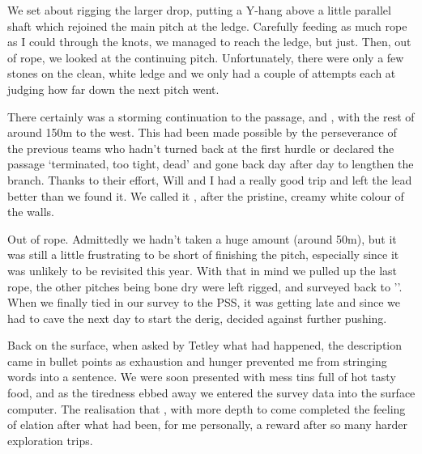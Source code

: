 We set about rigging the larger drop, putting a Y-hang above a little parallel shaft which rejoined the main pitch at the ledge. Carefully feeding as much rope as I could through the knots, we managed to reach the ledge, but just. Then, out of rope, we looked at the continuing pitch. Unfortunately, there were only a few stones on the clean, white ledge and we only had a couple of attempts each at judging how far down the next pitch went. 

There certainly was a storming continuation to the passage, and , with the rest of  around 150m to the west. This had been made possible by the perseverance of the previous teams who hadn’t turned back at the first hurdle or declared the passage ‘terminated, too tight, dead’ and gone back day after day to lengthen the branch.  Thanks to their effort, Will and I had  a really good trip and left the lead better than we found it. We called it , after the pristine, creamy white colour of the walls.

Out of rope. Admittedly we hadn’t taken a huge amount (around 50m), but it was still a little frustrating to be short of finishing the pitch, especially since it was unlikely to be revisited this year.  With that in mind we pulled up the last rope, the other pitches being bone dry were left rigged, and surveyed back to ''. When we  finally tied in our survey to the PSS, it was getting late and since we had to cave the next day to start the derig, decided against further pushing. 

Back on the surface, when asked by Tetley what had happened, the description came in bullet points as exhaustion and hunger prevented me from stringing words into a sentence. We were soon presented with mess tins full of hot tasty food, and as the tiredness ebbed away we entered the survey data into the surface computer. The realisation that , with more depth to come completed the feeling of elation after what had been, for me personally, a reward after so many harder exploration trips.

